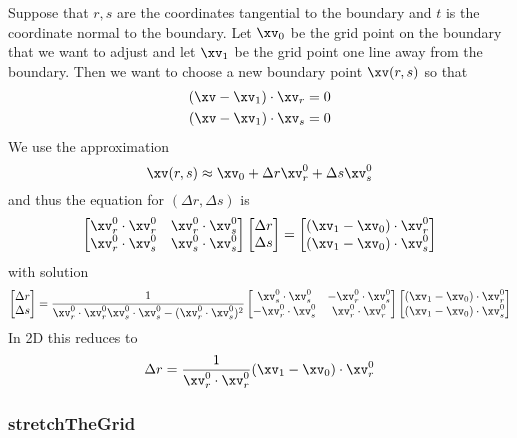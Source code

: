 \begin{description}
  Suppose that  $r,s$ are the coordinates tangential to the boundary and $t$ is the coordinate
  normal to the boundary. Let $\xv_0$ be the grid point on the boundary that we
 want to adjust and let $\xv_1$ be the grid point one line away from the boundary.
  Then we want to choose a new boundary 
 point $\xv(r,s)$ so that
 \begin{align*}
    (\xv-\xv_1) \cdot \xv_r &= 0 \\
    (\xv-\xv_1) \cdot \xv_s &= 0
 \end{align*}
 We use the approximation
 \[
    \xv(r,s) \approx \xv_0 + \Delta r \xv_r^0 + \Delta s \xv_s^0 
 \]
 and thus the equation for $(\Delta r,\Delta s)$ is
 \begin{align*}
   \begin{bmatrix}  
       \xv_r^0\cdot\xv_r^0 & \xv_r^0\cdot\xv_s^0 \\
       \xv_r^0\cdot\xv_s^0 & \xv_s^0\cdot\xv_s^0 
   \end{bmatrix}  
   \begin{bmatrix} \Delta r \\ \Delta s \end{bmatrix} =
   \begin{bmatrix} (\xv_1-\xv_0)\cdot \xv_r^0 \\ (\xv_1-\xv_0)\cdot \xv_s^0 \end{bmatrix}
 \end{align*}
 with solution
 \begin{align*}
   \begin{bmatrix} \Delta r \\ \Delta s \end{bmatrix} =
   {1\over \xv_r^0\cdot\xv_r^0 \xv_s^0\cdot\xv_s^0 - (\xv_r^0\cdot\xv_s^0)^2 }
    \begin{bmatrix}  
       \xv_s^0\cdot\xv_s^0 &-\xv_r^0\cdot\xv_s^0 \\
      -\xv_r^0\cdot\xv_s^0 & \xv_r^0\cdot\xv_r^0 
   \end{bmatrix}  
   \begin{bmatrix} (\xv_1-\xv_0)\cdot \xv_r^0 \\ (\xv_1-\xv_0)\cdot \xv_s^0 \end{bmatrix}
 \end{align*}
 In 2D this reduces to
 \[
  \Delta r = {1\over \xv_r^0\cdot\xv_r^0} (\xv_1-\xv_0)\cdot \xv_r^0
 \]

\end{description}
\subsubsection{stretchTheGrid}
 

